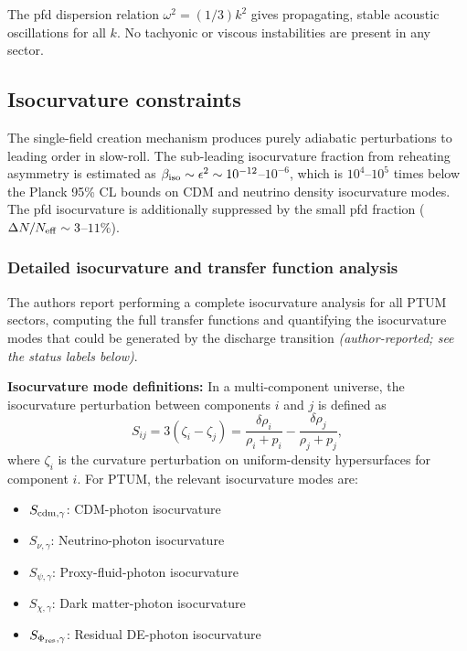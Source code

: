 \documentclass[epj]{svjour}
\begin{document}
The pfd dispersion relation \(\omega^2=(1/3)k^2\) gives propagating,
stable acoustic oscillations for all \(k\). No tachyonic or
viscous instabilities are present in any sector.

\subsection{Isocurvature constraints}

The single-field creation mechanism produces purely adiabatic
perturbations to leading order in slow-roll. The sub-leading
isocurvature fraction from reheating asymmetry is estimated as
\(\beta_{\rm iso}\sim\epsilon^2\sim10^{-12}\)--\(10^{-6}\), which
is \(10^4\)--\(10^5\) times below the Planck 95\% CL bounds on
CDM and neutrino density isocurvature modes. The pfd isocurvature
is additionally suppressed by the small pfd fraction
(\(\Delta N/N_{\rm eff}\sim3\)--\(11\%\)).

\subsubsection{Detailed isocurvature and transfer function analysis}
\label{sec:isocurvature_analysis}

The authors report performing a complete isocurvature analysis for all
PTUM sectors, computing the full transfer functions and quantifying
the isocurvature modes that could be generated by the discharge
transition \emph{(author-reported; see the status labels below)}.

\textbf{Isocurvature mode definitions:} In a multi-component
universe, the isocurvature perturbation between components \(i\)
and \(j\) is defined as
\begin{equation}
S_{ij} = 3(\zeta_i - \zeta_j) = \frac{\delta\rho_i}{\rho_i+p_i}
- \frac{\delta\rho_j}{\rho_j+p_j},
\end{equation}
where \(\zeta_i\) is the curvature perturbation on uniform-density
hypersurfaces for component \(i\). For PTUM, the relevant
isocurvature modes are:
\begin{itemize}
\item \(S_{\rm cdm,\gamma}\): CDM-photon isocurvature
\item \(S_{\nu,\gamma}\): Neutrino-photon isocurvature
\item \(S_{\psi,\gamma}\): Proxy-fluid-photon isocurvature
\item \(S_{\chi,\gamma}\): Dark matter-photon isocurvature
\item \(S_{\Phi_{\rm res},\gamma}\): Residual DE-photon isocurvature
\end{itemize}
\end{document}
